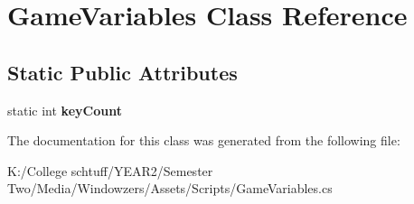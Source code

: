 \hypertarget{class_game_variables}{}\section{Game\+Variables Class Reference}
\label{class_game_variables}
\subsection*{Static Public Attributes}
\begin{DoxyCompactItemize}
\item 
\mbox{\label{class_game_variables_ae7dbf54df188bc16f162e2b1e5e8670b}} 
static int {\bfseries key\+Count}
\end{DoxyCompactItemize}


The documentation for this class was generated from the following file\+:\begin{DoxyCompactItemize}
\item 
K\+:/\+College schtuff/\+Y\+E\+A\+R2/\+Semester Two/\+Media/\+Windowzers/\+Assets/\+Scripts/Game\+Variables.\+cs\end{DoxyCompactItemize}
